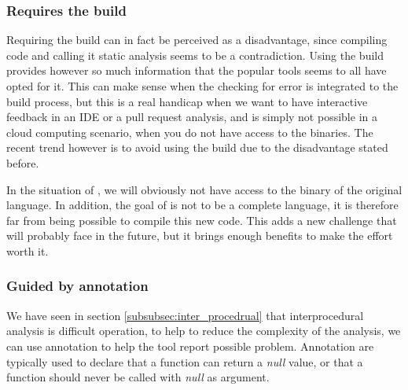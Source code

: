 \subsubsection{Requires the build}
\label{subsubsec:require_build}

Requiring the build can in fact be perceived as a disadvantage, since compiling code and calling it static analysis seems to be a contradiction. 
Using the build provides however so much information that the popular tools seems to all have opted for it. 
This can make sense when the checking for error is integrated to the build process, but this is a real handicap when we want to have interactive feedback in an IDE or a pull request analysis, and is simply not possible in a cloud computing scenario, when you do not have access to the binaries. 
The recent trend however is to avoid using the build due to the disadvantage stated before.

In the situation of \slang{}, we will obviously not have access to the binary of the original language. 
In addition, the goal of \slang{} is not to be a complete language, it is therefore far from being possible to compile this new code. 
This adds a new challenge that \slang{} will probably face in the future, but it brings enough benefits to make the effort worth it.

\subsubsection{Guided by annotation}
\label{subsubsec:guided_by_annotation}

We have seen in section \ref{subsubsec:inter_procedrual} that interprocedural analysis is difficult operation, to help to reduce the complexity of the analysis, we can use annotation to help the tool report possible problem. Annotation are typically used to declare that a function can return a \emph{null} value, or that a function should never be called with \emph{null} as argument.



